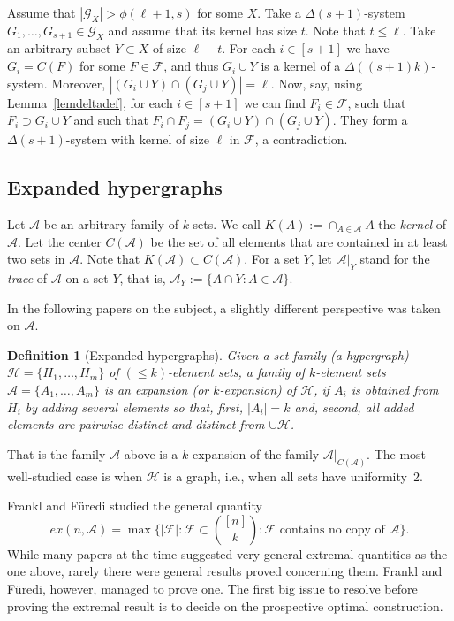\documentclass[graybox]{svmult}
\renewcommand{\le}{\leqslant}
\newcommand{\ff}{\mathcal{F}}
\newcommand{\m}{\mathcal}
\newtheorem{defn}[thm]{Definition}
\begin{document}
Assume that $|\m G_X|> \phi(\ell+1,s)$ for some $X$. Take a $\Delta(s+1)$-system $G_1,\ldots, G_{s+1}\in \m G_X$ and assume that its kernel has size $t$. Note that $t\le \ell$. Take an arbitrary subset $Y\subset X$ of size $\ell-t$. For each $i\in[s+1]$ we have $G_i = C(F)$ for some $F\in \ff$, and thus $G_i\cup Y$ is a kernel of a $\Delta((s+1)k)$-system. Moreover, $|(G_i\cup Y)\cap (G_j\cup Y)|=\ell$. Now, say, using Lemma~\ref{lemdeltadef}, for each $i\in [s+1]$ we can find  $F_i\in \ff$, such that $F_i\supset G_i\cup Y$ and such that $F_i\cap F_j = (G_i\cup Y)\cap (G_j\cup Y)$. They form  a $\Delta(s+1)$-system with kernel of size $\ell$ in $\ff$, a contradiction.

\subsection{Expanded hypergraphs}\label{sec42}
Let $\m A$ be an arbitrary family of $k$-sets. We call $K(A):=\cap_{A\in \m A}A$ the {\it kernel} of $\m A$. Let the center $C(\m A)$ be the set of all elements that are contained in at least two sets in $\m A$. Note that $K(\m A)\subset C(\m A)$. For a set $Y$, let $\m A|_{Y}$ stand for the {\it trace} of $\m A$ on a set $Y$, that is, $\m A_Y:=\{A\cap Y: A\in \m A\}$.

In the following papers on the subject, a slightly different perspective was taken on $\m A$.
\begin{defn}[Expanded hypergraphs]\label{defexp}
Given a set family (a hypergraph) $\m H= \{H_1,\ldots, H_m\}$ of $(\le k)$-element sets, a family of $k$-element sets $\m A = \{A_1,\ldots, A_m\}$ is an {\em expansion} (or {\em $k$-expansion}) of $\m H$, if $A_i$ is obtained from $H_i$ by adding several elements so that, first, $|A_i|=k$ and, second, all added elements are pairwise distinct and distinct from $\cup \m H$.
\end{defn}
That is the family $\m A$ above is a $k$-expansion of the family $\m A|_{C(\m A)}$. The most well-studied case is when $\m H$ is a graph, i.e., when all sets have uniformity~$2$.

Frankl and F\"uredi studied the general quantity
$$ex(n, \m A) = \max\Big\{|\ff|: \ff\subset {[n]\choose k}: \ff \text{ contains no copy of }\m A\Big\}.$$
While many papers at the time suggested very general extremal quantities as the one above, rarely there were general results proved concerning them. Frankl and F\"uredi, however, managed to prove one. The first big issue to resolve before proving the extremal result is to decide on the prospective optimal construction.
\end{document}
